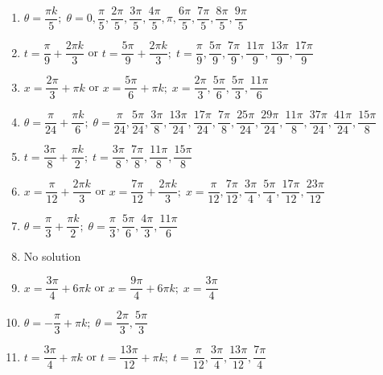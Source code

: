 \documentclass{ximera}
\begin{document}
\begin{enumerate}

\item $\theta = \dfrac{\pi k}{5}; \; \theta = 0, \dfrac{\pi}{5}, \dfrac{2\pi}{5}, \dfrac{3\pi}{5}, \dfrac{4\pi}{5}, \pi, \dfrac{6\pi}{5}, \dfrac{7\pi}{5}, \dfrac{8\pi}{5}, \dfrac{9\pi}{5}$

\item $t  = \dfrac{\pi}{9} + \dfrac{2\pi k}{3}$ or $t = \dfrac{5\pi}{9} + \dfrac{2\pi k}{3}; \; t = \dfrac{\pi}{9}, \dfrac{5\pi}{9}, \dfrac{7\pi}{9}, \dfrac{11\pi}{9}, \dfrac{13\pi}{9}, \dfrac{17\pi}{9}$

\item $x = \dfrac{2\pi}{3} + \pi k$ or $x = \dfrac{5\pi}{6} + \pi k; \; x = \dfrac{2\pi}{3}, \dfrac{5\pi}{6}, \dfrac{5\pi}{3}, \dfrac{11\pi}{6}$

\item $\theta = \dfrac{\pi}{24} + \dfrac{\pi k}{6}; \; \theta = \dfrac{\pi}{24}, \dfrac{5\pi}{24}, \dfrac{3\pi}{8}, \dfrac{13\pi}{24}, \dfrac{17\pi}{24}, \dfrac{7\pi}{8}, \dfrac{25\pi}{24}, \dfrac{29\pi}{24}, \dfrac{11\pi}{8}, \dfrac{37\pi}{24}, \dfrac{41\pi}{24}, \dfrac{15\pi}{8}$

\item $t = \dfrac{3\pi}{8} + \dfrac{\pi k}{2}; \; t = \dfrac{3\pi}{8}, \dfrac{7\pi}{8}, \dfrac{11\pi}{8}, \dfrac{15\pi}{8}$

\item $x = \dfrac{\pi}{12} + \dfrac{2\pi k}{3}$ or $x = \dfrac{7\pi}{12} + \dfrac{2\pi k}{3}; \; x = \dfrac{\pi}{12}, \dfrac{7\pi}{12}, \dfrac{3\pi}{4}, \dfrac{5\pi}{4}, \dfrac{17\pi}{12}, \dfrac{23\pi}{12}$

\item $\theta  = \dfrac{\pi}{3} + \dfrac{\pi k}{2}; \; \theta  = \dfrac{\pi}{3}, \dfrac{5\pi}{6}, \dfrac{4\pi}{3}, \dfrac{11\pi}{6}$

\item No solution

\item $x = \dfrac{3\pi}{4} + 6\pi k$ or $x = \dfrac{9\pi}{4} + 6\pi k; \; x = \dfrac{3\pi}{4}$

\item $\theta = -\dfrac{\pi}{3} + \pi k; \; \theta  = \dfrac{2\pi}{3}, \dfrac{5\pi}{3}$

\item $t = \dfrac{3\pi}{4} + \pi k$ or $t = \dfrac{13\pi}{12} + \pi k; \; t = \dfrac{\pi}{12}, \dfrac{3\pi}{4}, \dfrac{13\pi}{12}, \dfrac{7\pi}{4}$


\end{enumerate}
\end{document}
